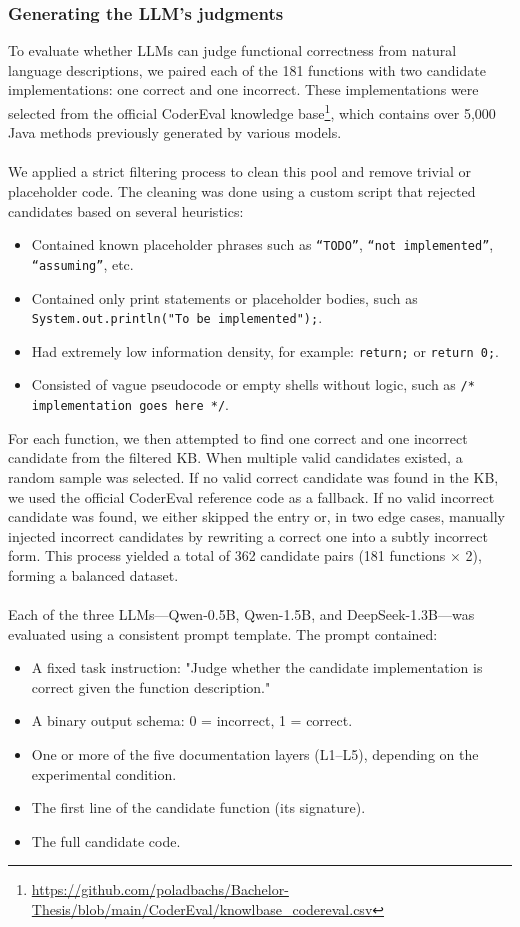 \documentclass[a4paper]{usiinfbachelorproject}
\begin{document}
\subsubsection{Generating the LLM’s judgments}\label{sec:judgments}
To evaluate whether LLMs can judge functional correctness from natural language descriptions, we paired each of the 181 functions with two candidate implementations: one correct and one incorrect. These implementations were selected from the official CoderEval knowledge base\footnote{\url{https://github.com/poladbachs/Bachelor-Thesis/blob/main/CoderEval/knowlbase_codereval.csv}}, which contains over 5,000 Java methods previously generated by various models.\\
\\[2pt]
We applied a strict filtering process to clean this pool and remove trivial or placeholder code. The cleaning was done using a custom script that rejected candidates based on several heuristics:
\begin{itemize}[leftmargin=12pt]
  \item Contained known placeholder phrases such as \texttt{“TODO”}, \texttt{“not implemented”}, \texttt{“assuming”}, etc.
  \item Contained only print statements or placeholder bodies, such as \texttt{System.out.println("To be implemented");}.
\item Had extremely low information density, for example: \texttt{return;} or \texttt{return 0;}.
\item Consisted of vague pseudocode or empty shells without logic, such as \texttt{/* implementation goes here */}.
\end{itemize}
For each function, we then attempted to find one correct and one incorrect candidate from the filtered KB. When multiple valid candidates existed, a random sample was selected. If no valid correct candidate was found in the KB, we used the official CoderEval reference code as a fallback. If no valid incorrect candidate was found, we either skipped the entry or, in two edge cases, manually injected incorrect candidates by rewriting a correct one into a subtly incorrect form. This process yielded a total of 362 candidate pairs (181 functions × 2), forming a balanced dataset.\\
\\[2pt]
Each of the three LLMs—Qwen-0.5B, Qwen-1.5B, and DeepSeek-1.3B—was evaluated using a consistent prompt template. The prompt contained:
\begin{itemize}[leftmargin=12pt]
  \item A fixed task instruction: "Judge whether the candidate implementation is correct given the function description."
  \item A binary output schema: 0 = incorrect, 1 = correct.
  \item One or more of the five documentation layers (L1–L5), depending on the experimental condition.
  \item The first line of the candidate function (its signature).
  \item The full candidate code.
\end{itemize}
\end{document}
